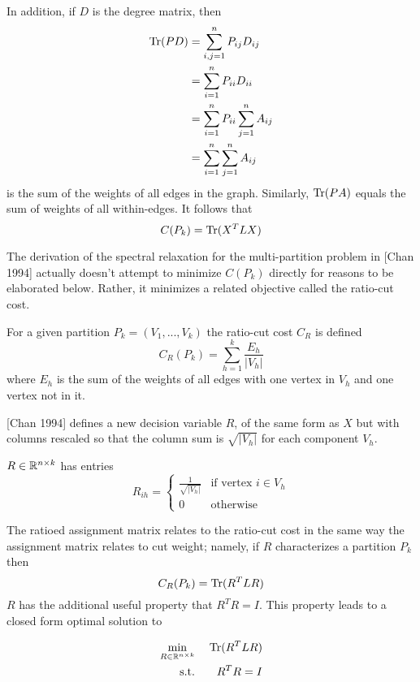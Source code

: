 In addition, if $D$ is the degree matrix, then
\begin{align*}
\operatorname{Tr}(P D) &= \sum_{i,j = 1}^n P_{ij} D_{ij} \\
         &= \sum_{i=1}^n P_{ii} D_{ii}  \\
         &= \sum_{i=1}^n P_{ii} \sum_{j=1}^n A_{ij} \\
         &= \sum_{i=1}^n \sum_{j=1}^n A_{ij}
\end{align*}
is the sum of the weights of all edges in the graph.
Similarly, $\operatorname{Tr}(P A)$ equals the sum of weights of all within-edges.
It follows that 
\[ C(P_k) = \operatorname{Tr}(X^T L X) \]

The derivation of the spectral relaxation for the multi-partition
problem in [Chan 1994] actually doesn't attempt to minimize $C(P_k)$
directly for reasons to be elaborated below. Rather, it minimizes a
related objective called the ratio-cut cost.

\begin{definition}
 For a given partition $P_k = (V_1, ..., V_k)$ the
ratio-cut cost $C_R$ is defined
\[ C_R(P_k) = \sum_{h=1}^k \frac{E_h}{|V_h|} \]
where $E_h$ is the sum of the weights of all edges with one vertex in
$V_h$ and one vertex not in it.
\end{definition}

[Chan 1994] defines a new decision variable $R$, of the same form as
$X$ but with columns rescaled so that the column sum is $\sqrt{|V_h|}$
for each component $V_h$.

\begin{definition}
 $R \in \mathbb{R}^{n \times k}$ has entries
\[ R_{ih} = \begin{cases}
		\frac{1}{\sqrt{|V_h|}} & \mbox{if vertex } i \in V_h \\
		0 & \mbox{otherwise}
\end{cases} \]
\end{definition}

The ratioed assignment matrix relates to the ratio-cut cost in the same
way the assignment matrix relates to cut weight; namely, if $R$
characterizes a partition $P_k$ then
\[ C_R(P_k) = \operatorname{Tr}(R^T L R) \]
$R$ has the additional useful property that $R^T R = I$. This property
leads to a closed form optimal solution to

\begin{equation} \label{spectral_k-partition}
\begin{aligned}
\min_{R \in \mathbb{R}^{n \times k}} &\;& \operatorname{Tr}(R^T L R) \\
\text{s.t.}                  &\;& R^T R = I    \\
\end{aligned}
\end{equation}

